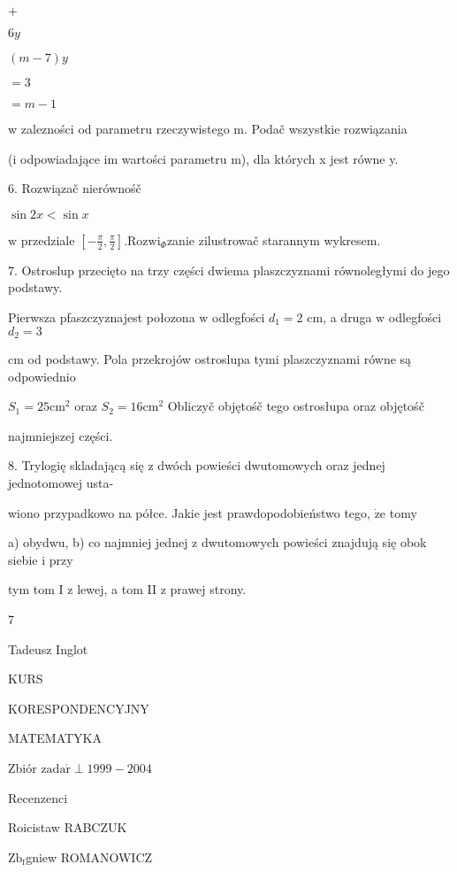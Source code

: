 \documentclass[a4paper,12pt]{article}
\begin{document}
$+$

$6y$

$(m-7)y$

$=3$

$=m-1$

w zalezności od parametru rzeczywistego m. Podač wszystkie rozwiązania

(i odpowiadające im wartości parametru m), dla których x jest równe y.

6. Rozwiązač nierównośč

$\sin 2x<\sin x$

$\mathrm{w}$ przedziale $[-\displaystyle \frac{\pi}{2},\frac{\pi}{2}]. \mathrm{R}\mathrm{o}\mathrm{z}\mathrm{w}\mathrm{i}_{\Phi}$zanie zilustrowač starannym wykresem.

7. Ostroslup przecięto na trzy części dwiema plaszczyznami równoległymi do jego podstawy.

Pierwsza pfaszczyznajest połozona $\mathrm{w}$ odlegfości $d_{1} =2$ cm, a druga $\mathrm{w}$ odlegfości $d_{2}=3$

cm od podstawy. Pola przekrojów ostroslupa tymi plaszczyznami równe są odpowiednio

$S_{1} = 25 \mathrm{c}\mathrm{m}^{2}$ oraz $S_{2} = 16 \mathrm{c}\mathrm{m}^{2}$ Obliczyč objętośč tego ostrosłupa oraz objętośč

najmniejszej części.

8. Trylogię skladającą się $\mathrm{z}$ dwóch powieści dwutomowych oraz jednej jednotomowej usta-

wiono przypadkowo na półce. Jakie jest prawdopodobieństwo tego, $\dot{\mathrm{z}}\mathrm{e}$ tomy

a) obydwu, b) co najmniej jednej $\mathrm{z}$ dwutomowych powieści znajdują się obok siebie $\mathrm{i}$ przy

tym tom I $\mathrm{z}$ lewej, a tom II $\mathrm{z}$ prawej strony.

7






Tadeusz Inglot

KURS

KORESPONDENCYJNY

MATEMATYKA

Zbiór $\mathrm{z}\mathrm{a}\mathrm{d}\mathrm{a}\acute{\mathrm{r}}\perp 1999-2004$




Recenzenci

Roicistaw RABCZUK

$\mathrm{Z}\mathrm{b}_{\mathrm{f}}$gniew ROMANOWICZ
\end{document}
